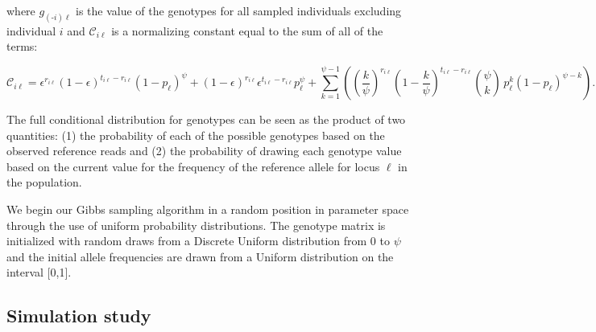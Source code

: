 \documentclass[11pt,english,letterpaper,oneside]{article}
\begin{document}
\noindent where $g_{(\text{-}i) \ell}$ is the value of the genotypes for all sampled individuals excluding individual $i$ and $\mathcal{C}_{i \ell}$ is a normalizing constant equal to the sum of all of the terms:

\begin{equation*}
\mathcal{C}_{i \ell} = \epsilon^{r_{i \ell}}(1-\epsilon)^{t_{i \ell}-r_{i \ell}}(1-p_{\ell})^\psi + (1-\epsilon)^{r_{i \ell}}\epsilon^{t_{i \ell}-r_{i \ell}}p_{\ell}^\psi + \sum_{k=1}^{\psi-1}\left(\left(\frac{k}{\psi}\right)^{r_{i \ell}}\left(1-\frac{k}{\psi}\right)^{t_{i \ell}-r_{i \ell}}\binom{\psi}{k}\,p_{\ell}^k(1-p_{\ell})^{\psi-k}\right).
\end{equation*}

\noindent The full conditional distribution for genotypes can be seen as the product of two quantities: (1) the probability of each of the possible genotypes based on the observed  reference reads and (2) the probability of drawing each genotype value based on the current value for the frequency of the reference allele for locus $\ell$ in the population. 

We begin our Gibbs sampling algorithm in a random position in parameter space through the use of uniform probability distributions. The genotype matrix is initialized with random draws from a Discrete Uniform distribution from $0$ to $\psi$ and the initial allele frequencies are drawn from a Uniform distribution on the interval [0,1]. 

\medskip
\subsection*{Simulation study}
\medskip
\end{document}
